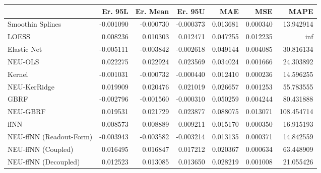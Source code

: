 \begin{tabular}{lrrrrrr}
\toprule
{} &   Er. 95L &  Er. Mean &   Er. 95U &       MAE &       MSE &        MAPE \\
\midrule
Smoothin Splines        & -0.001090 & -0.000730 & -0.000373 &  0.013681 &  0.000340 &   13.942914 \\
LOESS                   &  0.008236 &  0.010303 &  0.012471 &  0.047255 &  0.012235 &         inf \\
Elastic Net             & -0.005111 & -0.003842 & -0.002618 &  0.049144 &  0.004085 &   30.816134 \\
NEU-OLS                 &  0.022275 &  0.022924 &  0.023569 &  0.034024 &  0.001666 &   24.303892 \\
Kernel                  & -0.001031 & -0.000732 & -0.000440 &  0.012410 &  0.000236 &   14.596255 \\
NEU-KerRidge            &  0.019909 &  0.020476 &  0.021019 &  0.026657 &  0.001253 &   55.783555 \\
GBRF                    & -0.002796 & -0.001560 & -0.000310 &  0.050259 &  0.004244 &   80.431888 \\
NEU-GBRF                &  0.019531 &  0.021729 &  0.023877 &  0.088075 &  0.013071 &  108.454714 \\
ffNN                    &  0.008573 &  0.008889 &  0.009211 &  0.015170 &  0.000350 &   16.915193 \\
NEU-ffNN (Readout-Form) & -0.003943 & -0.003582 & -0.003214 &  0.013135 &  0.000371 &   14.842559 \\
NEU-ffNN (Coupled)      &  0.016495 &  0.016847 &  0.017212 &  0.020367 &  0.000634 &   63.448909 \\
NEU-ffNN (Decoupled)    &  0.012523 &  0.013085 &  0.013650 &  0.028219 &  0.001008 &   21.055426 \\
\bottomrule
\end{tabular}
